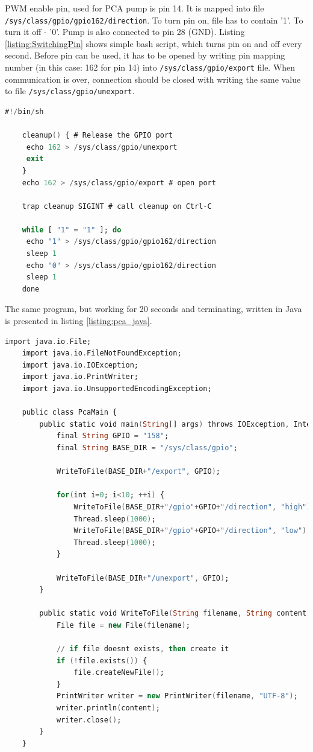 PWM enable pin, used for PCA pump is pin 14. It is mapped into file \lstinline{/sys/class/gpio/gpio162/direction}. To turn pin on, file has to contain '1'. To turn it off - '0'. Pump is also connected to pin 28 (GND). Listing \ref{listing:SwitchingPin} shows simple bash script, which turns pin on and off every second. Before pin can be used, it has to be opened by writing pin mapping number (in this case: 162 for pin 14) into \lstinline{/sys/class/gpio/export} file. When communication is over, connection should be closed with writing the same value to file \lstinline{/sys/class/gpio/unexport}.

\begin{lstlisting}[language=ada, frame=single, gobble=0, caption={Turning pin on and off}]
	#!/bin/sh
	
	cleanup() { # Release the GPIO port
	 echo 162 > /sys/class/gpio/unexport
	 exit
	}
	echo 162 > /sys/class/gpio/export # open port

	trap cleanup SIGINT # call cleanup on Ctrl-C

	while [ "1" = "1" ]; do
	 echo "1" > /sys/class/gpio/gpio162/direction
	 sleep 1
	 echo "0" > /sys/class/gpio/gpio162/direction 
	 sleep 1
	done
\end{lstlisting} 
\label{listing:SwitchingPin}

The same program, but working for 20 seconds and terminating, written in Java is presented in listing \ref{listing:pca_java}.

\begin{lstlisting}[language=ada, frame=single, gobble=0, caption={Turning pin on and off}]
	import java.io.File;
	import java.io.FileNotFoundException;
	import java.io.IOException;
	import java.io.PrintWriter;
	import java.io.UnsupportedEncodingException;

	public class PcaMain {
		public static void main(String[] args) throws IOException, InterruptedException {
			final String GPIO = "158";
			final String BASE_DIR = "/sys/class/gpio";
			
			WriteToFile(BASE_DIR+"/export", GPIO);
			
			for(int i=0; i<10; ++i) {
	            WriteToFile(BASE_DIR+"/gpio"+GPIO+"/direction", "high");
	            Thread.sleep(1000);
				WriteToFile(BASE_DIR+"/gpio"+GPIO+"/direction", "low");
	            Thread.sleep(1000);
			}
			
			WriteToFile(BASE_DIR+"/unexport", GPIO);
		}
		
		public static void WriteToFile(String filename, String content) throws IOException {
			File file = new File(filename);
			 
			// if file doesnt exists, then create it
			if (!file.exists()) {
				file.createNewFile();
			}
			PrintWriter writer = new PrintWriter(filename, "UTF-8");
			writer.println(content);
			writer.close();
		}
	}
\end{lstlisting} 
\label{listing:pca_java}


